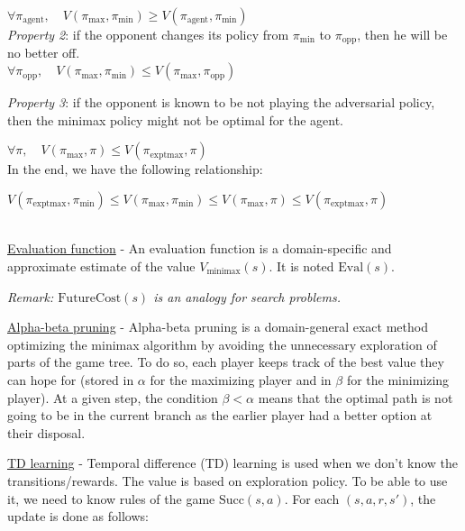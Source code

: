 \documentclass[4pt,landscape]{article}
\begin{document}
\begin{multicols*}{4}
{${\forall \pi_{\textrm{agent}},\quad V(\pi_{\textrm{max}},\pi_{\textrm{min}})\geqslant V(\pi_{\textrm{agent}},\pi_{\textrm{min}})}$\\

\textit{Property 2}: if the opponent changes its policy from $\pi_{\textrm{min}}$ to $\pi_{\textrm{opp}}$, then he will be no better off.\\

${\forall \pi_{\textrm{opp}},\quad V(\pi_{\textrm{max}},\pi_{\textrm{min}})\leqslant V(\pi_{\textrm{max}},\pi_{\textrm{opp}})}$

\textit{Property 3}: if the opponent is known to be not playing the adversarial policy, then the minimax policy might not be optimal for the agent.

${\forall \pi,\quad V(\pi_{\textrm{max}},\pi)\leqslant V(\pi_{\textrm{exptmax}},\pi)}$\\


In the end, we have the following relationship:

${V(\pi_{\textrm{exptmax}},\pi_{\textrm{min}})\leqslant V(\pi_{\textrm{max}},\pi_{\textrm{min}})\leqslant V(\pi_{\textrm{max}},\pi)\leqslant V(\pi_{\textrm{exptmax}},\pi)}$

}\par

{\color{cyan} \hrulefill}\\
{\underline{Evaluation function} - An evaluation function is a domain-specific and approximate estimate of the value $V_{\textrm{minimax}}(s)$. It is noted $\textrm{Eval}(s)$.}\par
{\textit{Remark: $\textrm{FutureCost}(s)$ is an analogy for search problems.}}\par

{\underline{Alpha-beta pruning} - Alpha-beta pruning is a domain-general exact method optimizing the minimax algorithm by avoiding the unnecessary exploration of parts of the game tree. To do so, each player keeps track of the best value they can hope for (stored in $\alpha$ for the maximizing player and in $\beta$ for the minimizing player). At a given step, the condition $\beta < \alpha$ means that the optimal path is not going to be in the current branch as the earlier player had a better option at their disposal.}\par

{\underline{TD learning} - Temporal difference (TD) learning is used when we don't know the transitions/rewards. The value is based on exploration policy. To be able to use it, we need to know rules of the game $\textrm{Succ}(s,a)$. For each $(s,a,r,s')$, the update is done as follows:}\par


\end{multicols*}
\end{document}
